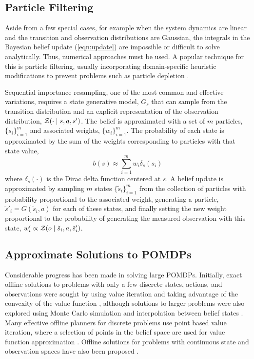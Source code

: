 \subsection{Particle Filtering} \label{sec:particle}

Aside from a few special cases, for example when the system dynamics are linear and the transition and observation distributions are Gaussian, the integrals in the Bayesian belief update (\ref{eqn:update}) are impossible or difficult to solve analytically.
Thus, numerical approaches must be used.
A popular technique for this is particle filtering, usually incorporating domain-specific heuristic modifications to prevent problems such as particle depletion \cite{thrun2005probabilistic}.

Sequential importance resampling, one of the most common and effective variations, requires a state generative model, $G_s$ that can sample from the transition distribution and an explicit representation of the observation distribution, $\mathcal{Z}(\cdot \mid s, a, s')$.
The belief is approximated with a set of $m$ particles, $\{s_i\}_{i=1}^m$ and associated weights, $\{w_i\}_{i=1}^m$.
The probability of each state is approximated by the sum of the weights corresponding to particles with that state value,
\begin{equation}
    b(s) \approx \sum_{i=1}^m w_i \delta_s (s_i)
\end{equation}
where $\delta_s(\cdot)$ is the Dirac delta function centered at $s$.
A belief update is approximated by sampling $m$ states $\{\tilde{s}_i\}_{i=1}^m$ from the collection of particles with probability proportional to the associated weight, generating a particle, $\tilde{s}'_i = G(\tilde{s}_i, a)$ for each of these states, and finally setting the new weight proportional to the probability of generating the measured observation with this state, $w'_i \propto \mathcal{Z}(o \mid \tilde{s}_i, a, \tilde{s}'_i)$.

\subsection{Approximate Solutions to POMDPs} \label{sec:solutions}

Considerable progress has been made in solving large POMDPs.
Initially, exact offline solutions to problems with only a few discrete states, actions, and observations were sought by using value iteration and taking advantage of the convexity of the value function \cite{kaelbling1998planning}, although solutions to larger problems were also explored using Monte Carlo simulation and interpolation between belief states \cite{thrun1999monte}.
Many effective offline planners for discrete problems use point based value iteration, where a selection of points in the belief space are used for value function approximation \cite{kurniawati2008sarsop}.
Offline solutions for problems with continuous state and observation spaces have also been proposed \cite{bai2014integrated,brechtel2013solving}.

